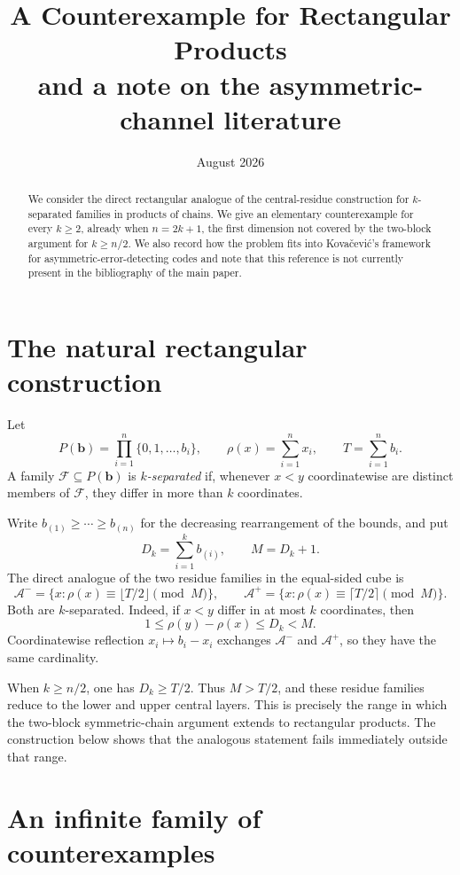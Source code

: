\documentclass[11pt]{article}
\title{A Counterexample for Rectangular Products\\
\large and a note on the asymmetric-channel literature}
\author{}
\date{August 2026}
\theoremstyle{definition}
\newcommand{\rank}{\rho}
\begin{document}
\maketitle

\begin{abstract}
We consider the direct rectangular analogue of the central-residue
construction for $k$-separated families in products of chains.  We give an
elementary counterexample for every $k\geq 2$, already when $n=2k+1$, the
first dimension not covered by the two-block argument for $k\geq n/2$.
We also record how the problem fits into Kova\v{c}evi\'c's framework for
asymmetric-error-detecting codes and note that this reference is not currently
present in the bibliography of the main paper.
\end{abstract}

\section{The natural rectangular construction}

Let
\[
  P(\mathbf b)=\prod_{i=1}^n\{0,1,\ldots,b_i\},
  \qquad \rank(x)=\sum_{i=1}^n x_i,
  \qquad T=\sum_{i=1}^n b_i.
\]
A family $\mathcal F\subseteq P(\mathbf b)$ is \emph{$k$-separated} if,
whenever $x<y$ coordinatewise are distinct members of $\mathcal F$, they
differ in more than $k$ coordinates.

Write $b_{(1)}\geq\cdots\geq b_{(n)}$ for the decreasing rearrangement of
the bounds, and put
\[
  D_k=\sum_{i=1}^k b_{(i)},\qquad M=D_k+1.
\]
The direct analogue of the two residue families in the equal-sided cube is
\[
  \mathcal A^-=
  \{x:\rank(x)\equiv\lfloor T/2\rfloor\pmod M\},\qquad
  \mathcal A^+=
  \{x:\rank(x)\equiv\lceil T/2\rceil\pmod M\}.
\]
Both are $k$-separated.  Indeed, if $x<y$ differ in at most $k$
coordinates, then
\[
  1\leq \rank(y)-\rank(x)\leq D_k<M.
\]
Coordinatewise reflection $x_i\mapsto b_i-x_i$ exchanges $\mathcal A^-$
and $\mathcal A^+$, so they have the same cardinality.

When $k\geq n/2$, one has $D_k\geq T/2$.  Thus $M>T/2$, and these residue
families reduce to the lower and upper central layers.  This is precisely the
range in which the two-block symmetric-chain argument extends to rectangular
products.  The construction below shows that the analogous statement fails
immediately outside that range.

\section{An infinite family of counterexamples}
\end{document}
